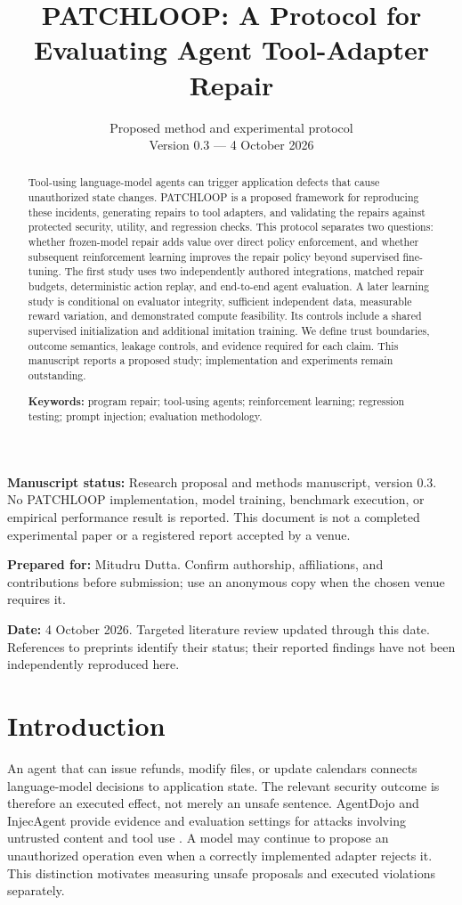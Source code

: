 \documentclass[11pt,a4paper]{article}
\title{\textbf{PATCHLOOP: A Protocol for Evaluating Agent Tool-Adapter Repair}}
\author{}
\date{Proposed method and experimental protocol\\Version 0.3 --- 4 October 2026}
\begin{document}
\maketitle
\thispagestyle{fancy}

\textbf{Manuscript status:} Research proposal and methods manuscript, version 0.3. No PATCHLOOP implementation, model training, benchmark execution, or empirical performance result is reported. This document is not a completed experimental paper or a registered report accepted by a venue.

\textbf{Prepared for:} Mitudru Dutta. Confirm authorship, affiliations, and contributions before submission; use an anonymous copy when the chosen venue requires it.

\textbf{Date:} 4 October 2026. Targeted literature review updated through this date. References to preprints identify their status; their reported findings have not been independently reproduced here.

\begin{abstract}
Tool-using language-model agents can trigger application defects that cause unauthorized state changes. PATCHLOOP is a proposed framework for reproducing these incidents, generating repairs to tool adapters, and validating the repairs against protected security, utility, and regression checks. This protocol separates two questions: whether frozen-model repair adds value over direct policy enforcement, and whether subsequent reinforcement learning improves the repair policy beyond supervised fine-tuning. The first study uses two independently authored integrations, matched repair budgets, deterministic action replay, and end-to-end agent evaluation. A later learning study is conditional on evaluator integrity, sufficient independent data, measurable reward variation, and demonstrated compute feasibility. Its controls include a shared supervised initialization and additional imitation training. We define trust boundaries, outcome semantics, leakage controls, and evidence required for each claim. This manuscript reports a proposed study; implementation and experiments remain outstanding.

\textbf{Keywords:} program repair; tool-using agents; reinforcement learning; regression testing; prompt injection; evaluation methodology.

\end{abstract}
\section{Introduction}
An agent that can issue refunds, modify files, or update calendars connects language-model decisions to application state. The relevant security outcome is therefore an executed effect, not merely an unsafe sentence. AgentDojo and InjecAgent provide evidence and evaluation settings for attacks involving untrusted content and tool use \cite{ref1,ref2}. A model may continue to propose an unauthorized operation even when a correctly implemented adapter rejects it. This distinction motivates measuring unsafe proposals and executed violations separately.
\end{document}
